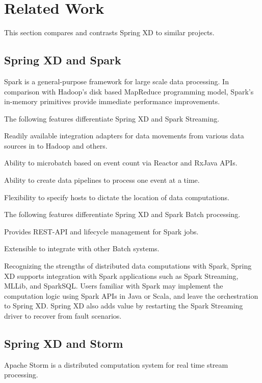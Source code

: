 \section{Related Work}
This section compares and contrasts Spring XD to similar projects.

\subsection{Spring XD and Spark}
Spark\cite{spark} is a general-purpose framework for large scale data processing.
In comparison with Hadoop's disk based MapReduce programming model, Spark's 
in-memory primitives provide immediate performance improvements.

The following features differentiate Spring XD and Spark Streaming.

\begin{itemize*}
\item Readily available integration adapters for data movements from various 
data sources in to Hadoop and others.
\item Ability to microbatch based on event count via Reactor and RxJava APIs.
\item Ability to create data pipelines to process one event at a time.
\item Flexibility to specify hosts to dictate the location of data computations.
\end{itemize*}

The following features differentiate Spring XD and Spark Batch processing.

\begin{itemize*}
\item Provides REST-API and lifecycle management for Spark jobs.
\item Extensible to integrate with other Batch systems.
\end{itemize*}

Recognizing the strengths of distributed data computations with Spark, Spring XD 
supports integration with Spark applications such as Spark Streaming, MLLib, and 
SparkSQL. Users familiar with Spark may implement the computation logic using 
Spark APIs in Java or Scala, and leave the orchestration to Spring XD. 
Spring XD also adds value by restarting the Spark Streaming driver to recover 
from fault scenarios.

\subsection{Spring XD and Storm}
Apache Storm\cite{storm} is a distributed computation system for real time stream 
processing.

